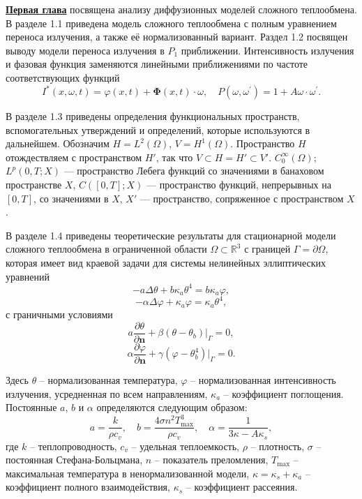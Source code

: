 \underline{\textbf{Первая глава}} посвящена анализу
диффузионных моделей сложного теплообмена.
В разделе 1.1 приведена модель сложного теплообмена с
полным уравнением переноса излучения, а также её нормализованный вариант.
Раздел 1.2 посвящен выводу модели переноса излучения в
$P_1$ приближении.
Интенсивность излучения и фазовая функция заменяются линейными приближениями
по частоте соответствующих функций
\[
    I^{*}(x, \omega, t) = \varphi(x, t)
    +\boldsymbol{\Phi}(x, t) \cdot \omega, \quad
    P\left(\omega, \omega^{\prime}\right)= 1
    + A \omega \cdot \omega^{\prime}.
\]


В разделе 1.3 приведены определения функциональных пространств,
вспомогательных утверждений и определений,
которые используются в дальнейшем.
Обозначим $H = L^2(\Omega)$, $V = H^1(\Omega)$.
Пространство $H$ отождествляем с пространством $H'$,
так что $V \subset H = H' \subset V'$.
$C^\infty_0(\Omega)$; $L^p(0, T; X)$ — пространство Лебега функций
со значениями в банаховом пространстве $X$, $C([0, T]; X)$ — пространство
функций, непрерывных на $[0, T]$, со значениями в $X$, $X'$ — пространство,
сопряженное с пространством $X$.


В разделе 1.4 приведены теоретические результаты для
стационарной модели сложного теплообмена
в ограниченной области $\Omega \subset \mathbb{R}^3$ с границей $\Gamma=\partial \Omega$,
которая имеет вид краевой задачи для системы нелинейных эллиптических уравнений
\begin{equation}
    \label{eq:1_4:4-1}
    -a \Delta \theta + b \kappa_a \theta^4 =  b \kappa_a \varphi,
\end{equation}
\begin{equation}
    \label{eq:1_4:4-2}
    - \alpha \Delta \varphi + \kappa_a \varphi = \kappa_a \theta^4,
\end{equation}
с граничными условиями
\begin{equation}
    \label{eq:1_4:4-3}
    a \frac{\partial \theta}{\partial \mathbf{n}}
    +\left.\beta\left(\theta-\theta_{b}\right)\right|_{\Gamma}=0,
\end{equation}
\begin{equation}
    \label{eq:1_4:4-4}
    \alpha \frac{\partial \varphi}{\partial \mathbf{n}} + \gamma
    (\varphi-\theta_b^4)|_{\Gamma} = 0.
\end{equation}



Здесь $\theta$ -- нормализованная температура, $\varphi$ --
нормализованная интенсивность излучения, усредненная по всем
направлениям, $\kappa_a$ -- коэффициент поглощения.
Постоянные $a$, $b$ и $\alpha$ определяются следующим образом:
\[
    a=\frac{k}{\rho c_v},\quad b = \frac{4\sigma n^2 T_{\max}^3}{\rho c_v},
    \quad \alpha=\frac{1}{3\kappa - A \kappa_s},
\]
где $k$ -- теплопроводность, $c_v$ -- удельная теплоемкость, $\rho$ --
плотность, $\sigma$ -- постоянная Стефана-Больцмана, $n$ --
показатель преломления, $T_{\max}$ -- максимальная температура в
ненормализованной модели, $\kappa = \kappa_s + \kappa_a$ -- коэффициент
полного взаимодействия, $\kappa_s$ -- коэффициент рассеяния.

